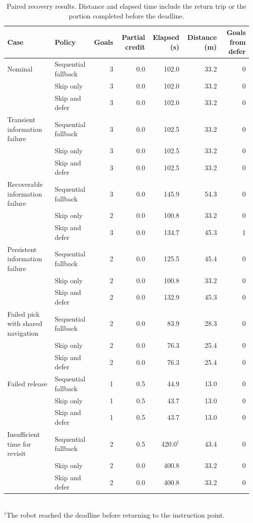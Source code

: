 \documentclass[conference]{IEEEtran}
\begin{document}
\begin{table}[t]
\centering
\caption{Paired recovery results. Distance and elapsed time include the
return trip or the portion completed before the deadline.}
\label{tab:recovery}
\begin{tabular}{llrrrrr}
\toprule
Case & Policy & Goals & Partial credit & Elapsed (s) & Distance (m) & Goals from defer \\
\midrule
Nominal & Sequential fallback & 3 & 0.0 & 102.0 & 33.2 & 0 \\
 & Skip only & 3 & 0.0 & 102.0 & 33.2 & 0 \\
 & Skip and defer & 3 & 0.0 & 102.0 & 33.2 & 0 \\
\addlinespace
Transient information failure & Sequential fallback & 3 & 0.0 & 102.5 & 33.2 & 0 \\
 & Skip only & 3 & 0.0 & 102.5 & 33.2 & 0 \\
 & Skip and defer & 3 & 0.0 & 102.5 & 33.2 & 0 \\
\addlinespace
Recoverable information failure & Sequential fallback & 3 & 0.0 & 145.9 & 54.3 & 0 \\
 & Skip only & 2 & 0.0 & 100.8 & 33.2 & 0 \\
 & Skip and defer & 3 & 0.0 & 134.7 & 45.3 & 1 \\
\addlinespace
Persistent information failure & Sequential fallback & 2 & 0.0 & 125.5 & 45.4 & 0 \\
 & Skip only & 2 & 0.0 & 100.8 & 33.2 & 0 \\
 & Skip and defer & 2 & 0.0 & 132.9 & 45.3 & 0 \\
\addlinespace
Failed pick with shared navigation & Sequential fallback & 2 & 0.0 & 83.9 & 28.3 & 0 \\
 & Skip only & 2 & 0.0 & 76.3 & 25.4 & 0 \\
 & Skip and defer & 2 & 0.0 & 76.3 & 25.4 & 0 \\
\addlinespace
Failed release & Sequential fallback & 1 & 0.5 & 44.9 & 13.0 & 0 \\
 & Skip only & 1 & 0.5 & 43.7 & 13.0 & 0 \\
 & Skip and defer & 1 & 0.5 & 43.7 & 13.0 & 0 \\
\addlinespace
Insufficient time for revisit & Sequential fallback & 2 & 0.5 & 420.0$^{\dagger}$ & 43.4 & 0 \\
 & Skip only & 2 & 0.0 & 400.8 & 33.2 & 0 \\
 & Skip and defer & 2 & 0.0 & 400.8 & 33.2 & 0 \\
\bottomrule
\end{tabular}\\[2pt]
{\footnotesize $^\dagger$The robot reached the deadline before returning to the instruction point.}
\end{table}
\end{document}
